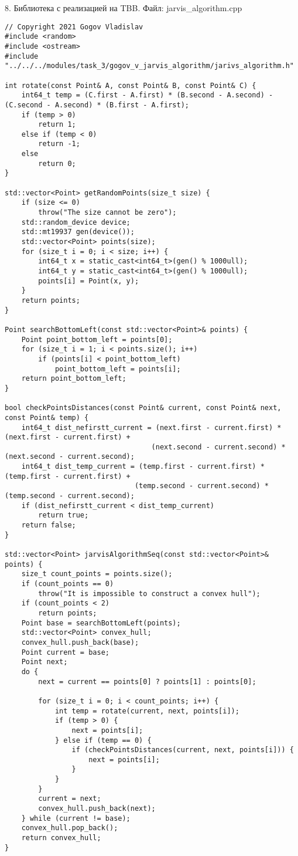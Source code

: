 \documentclass{report}
\begin{document}
\par 8. Библиотека с реализацией на TBB. Файл: jarvis\_algorithm.cpp
\begin{lstlisting}
// Copyright 2021 Gogov Vladislav
#include <random>
#include <ostream>
#include "../../../modules/task_3/gogov_v_jarvis_algorithm/jarivs_algorithm.h"

int rotate(const Point& A, const Point& B, const Point& C) {
    int64_t temp = (C.first - A.first) * (B.second - A.second) - (C.second - A.second) * (B.first - A.first);
    if (temp > 0)
        return 1;
    else if (temp < 0)
        return -1;
    else
        return 0;
}

std::vector<Point> getRandomPoints(size_t size) {
    if (size <= 0)
        throw("The size cannot be zero");
    std::random_device device;
    std::mt19937 gen(device());
    std::vector<Point> points(size);
    for (size_t i = 0; i < size; i++) {
        int64_t x = static_cast<int64_t>(gen() % 1000ull);
        int64_t y = static_cast<int64_t>(gen() % 1000ull);
        points[i] = Point(x, y);
    }
    return points;
}

Point searchBottomLeft(const std::vector<Point>& points) {
    Point point_bottom_left = points[0];
    for (size_t i = 1; i < points.size(); i++)
        if (points[i] < point_bottom_left)
            point_bottom_left = points[i];
    return point_bottom_left;
}

bool checkPointsDistances(const Point& current, const Point& next, const Point& temp) {
    int64_t dist_nefirstt_current = (next.first - current.first) * (next.first - current.first) +
                                   (next.second - current.second) * (next.second - current.second);
    int64_t dist_temp_current = (temp.first - current.first) * (temp.first - current.first) +
                               (temp.second - current.second) * (temp.second - current.second);
    if (dist_nefirstt_current < dist_temp_current)
        return true;
    return false;
}

std::vector<Point> jarvisAlgorithmSeq(const std::vector<Point>& points) {
    size_t count_points = points.size();
    if (count_points == 0)
        throw("It is impossible to construct a convex hull");
    if (count_points < 2)
        return points;
    Point base = searchBottomLeft(points);
    std::vector<Point> convex_hull;
    convex_hull.push_back(base);
    Point current = base;
    Point next;
    do {
        next = current == points[0] ? points[1] : points[0];

        for (size_t i = 0; i < count_points; i++) {
            int temp = rotate(current, next, points[i]);
            if (temp > 0) {
                next = points[i];
            } else if (temp == 0) {
                if (checkPointsDistances(current, next, points[i])) {
                    next = points[i];
                }
            }
        }
        current = next;
        convex_hull.push_back(next);
    } while (current != base);
    convex_hull.pop_back();
    return convex_hull;
}


\end{lstlisting}
\end{document}
